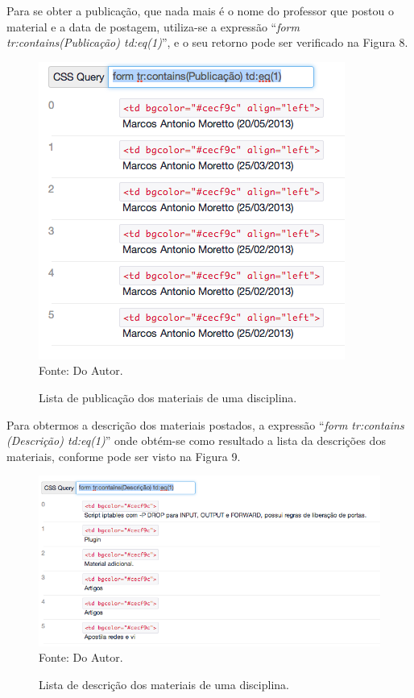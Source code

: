 Para se obter a publicação, que nada mais é o nome do professor que postou o material e a data de postagem, utiliza-se a expressão ``\emph{form tr:contains(Publicação) td:eq(1)}'', e o seu retorno pode ser verificado na Figura 8.

\begin{figure}[!htb]
     \centering     
     \caption[Extração de Informações - Lista das publicações dos materiais]{Lista de publicação dos materiais de uma disciplina.}
     \includegraphics[scale=0.7]{imagens/listamateriaisdisciplinaspublicacao.png}
     \\  Fonte: Do Autor.
\end{figure}

Para obtermos a descrição dos materiais postados, a expressão ``\emph{form tr:contains\\(Descrição) td:eq(1)}'' onde obtém-se como resultado a lista da descrições dos materiais, conforme pode ser visto na Figura 9.

\begin{figure}[!htb]
     \centering
     \caption[Extração de Informações - Lista das descrições dos materiais]{Lista de descrição dos materiais de uma disciplina.}
     \includegraphics[scale=0.6]{imagens/listamateriaisdisciplinasdescricao.png}
     \\  Fonte: Do Autor.
\end{figure}

